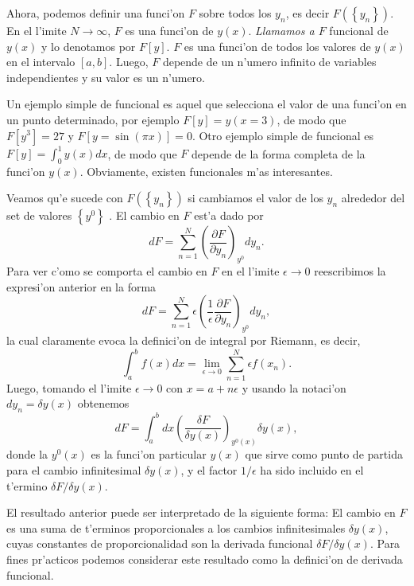 Ahora, podemos definir una funci'on $F$ sobre todos los $y_n$, es decir
$F(\left\lbrace y_n\right\rbrace)$. En el l'imite $N\rightarrow\infty$, $F$ es
una funci'on de $y(x)$. \textit{Llamamos a $F$} funcional de $y(x)$ y lo
denotamos por $F\left[ y\right] $. $F$ es una funci'on de todos los valores de
$y(x)$ en el intervalo $\left[ a,b\right] $. Luego, $F$ depende de un n'umero
infinito de variables independientes y su valor es un n'umero.

Un ejemplo simple de funcional es aquel que selecciona el valor de una funci'on
en un punto determinado, por ejemplo $F\left[ y\right]=y(x=3)$, de modo que
$F\left[ y^3\right]=27 $ y $F\left[ y=\sin(\pi x)\right]=0 $. Otro ejemplo
simple de funcional es $F\left[ y\right]=\int_0^1y(x)dx$, de modo que $F$
depende de la forma completa de la funci'on $y(x)$. Obviamente, existen
funcionales m'as interesantes.

Veamos qu'e sucede con $F(\left\lbrace y_n\right\rbrace)$ si cambiamos el valor
de los $y_n$ alrededor del set de valores $\left\lbrace y^0\right\rbrace$ . El
cambio en $F$ est'a dado por 
\begin{equation}
dF=\sum_{n=1}^N\left( \frac{\partial F}{\partial y_n}\right)_{y^0} dy_n.
\end{equation}
Para ver c'omo se comporta el cambio en $F$ en el l'imite $\epsilon\rightarrow 0$
reescribimos la expresi'on anterior en la forma
\begin{equation}
dF=\sum_{n=1}^N \epsilon\left(\frac{1}{\epsilon} \frac{\partial F}{\partial
y_n}\right)_{y^0} dy_n,
\end{equation}
la cual claramente evoca la definici'on  de integral por Riemann, es decir,
\begin{equation}
\int_{a}^b f(x)dx=\lim_{\epsilon\rightarrow 0}\sum_{n=1}^N \epsilon f(x_n).
\end{equation}
Luego, tomando el l'imite $\epsilon\rightarrow 0$ con $x=a+n\epsilon $ y usando
la notaci'on $dy_n=\delta y(x)$ obtenemos
\begin{equation}
dF=\int_a^b dx \left( \frac{\delta F}{\delta y(x)}\right)_{y^0(x)}\delta y(x),
\end{equation}
donde la $y^0(x)$ es la funci'on particular $y(x)$ que sirve como punto de
partida para el cambio infinitesimal $\delta y(x)$, y el factor $1/\epsilon$ ha
sido incluido en el t'ermino $\delta F/\delta y(x)$.

El resultado anterior puede ser interpretado de la siguiente forma: El cambio en
$F$ es una suma de t'erminos proporcionales a los cambios infinitesimales $\delta
y(x)$, cuyas constantes de proporcionalidad son la derivada funcional $\delta
F/\delta y(x)$. Para fines pr'acticos podemos considerar este resultado como la
definici'on de derivada funcional.

